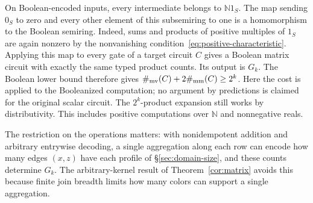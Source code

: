 On Boolean-encoded inputs, every intermediate belongs to $\mathbb N1_S$.
The map sending $0_S$ to zero and every other element of this subsemiring
to one is a homomorphism to the Boolean semiring. Indeed, sums and products
of positive multiples of $1_S$ are again nonzero by the nonvanishing
condition~\eqref{eq:positive-characteristic}. Applying this map to every gate of
a target circuit $C$ gives a Boolean matrix circuit with exactly the same
typed product counts.
Its output is $G_k$. The Boolean lower bound therefore gives
$\#_{\mathrm{mv}}(C)+2\#_{\mathrm{mm}}(C)\ge2^k$.
Here the cost is applied to the Booleanized computation; no argument by
predictions is claimed for the original scalar circuit.
The $2^k$-product expansion still works by distributivity. This includes
positive computations over $\mathbb N$ and nonnegative reals.

The restriction on the operations matters: with nonidempotent addition
and arbitrary entrywise decoding, a single aggregation along each row
can encode how many edges $(x,z)$ have each profile of
\S\ref{sec:domain-size}, and these counts determine $G_k$. The
arbitrary-kernel result of Theorem~\ref{cor:matrix} avoids this because
finite join breadth limits how many colors can support a single
aggregation.
